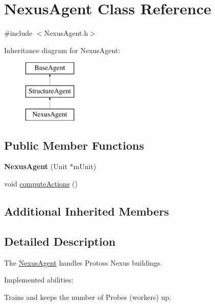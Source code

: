 \hypertarget{class_nexus_agent}{\section{Nexus\-Agent Class Reference}
\label{class_nexus_agent}
}


{\ttfamily \#include $<$Nexus\-Agent.\-h$>$}

Inheritance diagram for Nexus\-Agent\-:\begin{figure}[H]
\begin{center}
\leavevmode
\includegraphics[height=3.000000cm]{class_nexus_agent}
\end{center}
\end{figure}
\subsection*{Public Member Functions}
\begin{DoxyCompactItemize}
\item 
\hypertarget{class_nexus_agent_ae62c481ce3beea9ab9c3a874ea15b61d}{{\bfseries Nexus\-Agent} (Unit $\ast$m\-Unit)}\label{class_nexus_agent_ae62c481ce3beea9ab9c3a874ea15b61d}

\item 
void \hyperlink{class_nexus_agent_af918e93ad5401e6a5c5d29665cca1ebf}{compute\-Actions} ()
\end{DoxyCompactItemize}
\subsection*{Additional Inherited Members}


\subsection{Detailed Description}
The \hyperlink{class_nexus_agent}{Nexus\-Agent} handles Protoss Nexus buildings.

Implemented abilities\-:
\begin{DoxyItemize}
\item Trains and keeps the number of Probes (workers) up.
\end{DoxyItemize}


